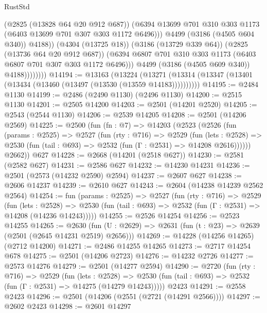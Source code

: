 \begin{lexlean}{RustStd}
\begin{coremodule}
                            (@2825 (@13828 @64 @20 @912 @687))
                            (@6394
                              @13699
                              @701
                              @310
                              @303
                              @1173
                              (@6403 @13699 @701 @307 @303 @1172 @6496)))
                          @4499
                          (@3186 (@4505 @604 @340))
                          @4188))
                      (@4304 (@13725 @18))
                      (@3186 (@13729 @339 @64))
                      (@2825 (@13736 @64 @20 @912 @687))
                      (@6394 @6807 @701 @310 @303 @1173 (@6403 @6807 @701 @307 @303 @1172 @6496)))
                    @4499
                    (@3186 (@4505 @609 @340))
                    @4188))))))))
@14194 := @13163
    (@13224 (@13271 (@13314 (@13347 (@13401 (@13434 (@13460 (@13497 (@13530 (@13559 @14183))))))))))
@14195 := @2484 @1130
@14199 := @2486 (@2490 @1130) (@2496 @1130)
@14200 := @2515 @1130
@14201 := @2505 @14200
@14203 := @2501 (@14201 @2520)
@14205 := @2543 (@2544 @1130)
@14206 := @2539 @14205
@14208 := @2501 (@14206 @2569)
@14225 := @2500
    (fun (fn : @7) =>
    @14203
      (@2523
        (@2526
          (fun (params : @2525) =>
          @2527
            (fun (rty : @716) =>
            @2529
              (fun (lets : @2528) =>
              @2530 (fun (tail : @693) => @2532 (fun (Γ : @2531) => @14208 @2616))))))
        @2662))
    @627
@14228 := @2668 (@14201 (@2518 @627))
@14230 := @2581 (@2582 @627)
@14231 := @2586 @627
@14232 := @14230 @14231
@14236 := @2501 (@2573 (@14232 @2590) @2594)
@14237 := @2607 @627
@14238 := @2606 @14237
@14239 := @2610 @627
@14243 := @2604 (@14238 @14239 @2562 @2564)
@14254 := fun (params : @2525) =>
  @2527
    (fun (rty : @716) =>
    @2529
      (fun (lets : @2528) =>
      @2530 (fun (tail : @693) => @2532 (fun (Γ : @2531) => @14208 (@14236 @14243)))))
@14255 := @2526 @14254
@14256 := @2523 @14255
@14265 := @2630
    (fun (U : @2629) => @2631 (fun (t : @23) => @2639 (@2501 (@2645 @14231 @2519) @2656)))
@14269 := @14228 (@14256 @14265) (@2712 @14200)
@14271 := @2486 @14255 @14265
@14273 := @2717 @14254 @678
@14275 := @2501 (@14206 @2723)
@14276 := @14232 @2726
@14277 := @2573 @14276
@14279 := @2501 (@14277 @2594)
@14290 := @2720
    (fun (rty : @716) =>
    @2529
      (fun (lets : @2528) =>
      @2530 (fun (tail : @693) => @2532 (fun (Γ : @2531) => @14275 (@14279 @14243)))))
    @2423
@14291 := @2558 @2423
@14296 := @2501 (@14206 (@2551 (@2721 (@14291 @2566))))
@14297 := @2602 @2423
@14298 := @2601 @14297

\end{coremodule}
\end{lexlean}

